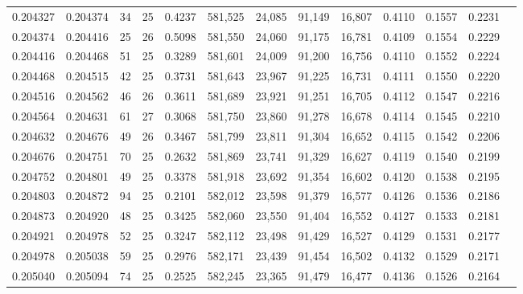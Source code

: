 \begin{tabular}{rrrrrrrrrrrrr}
0.204327 & 0.204374 &  34 &  25 &                                     0.4237 & 581,525 &  24,085 &  91,149 &  16,807 & 0.4110 & 0.1557 & 0.2231 \\
0.204374 & 0.204416 &  25 &  26 &                                     0.5098 & 581,550 &  24,060 &  91,175 &  16,781 & 0.4109 & 0.1554 & 0.2229 \\
0.204416 & 0.204468 &  51 &  25 &                                     0.3289 & 581,601 &  24,009 &  91,200 &  16,756 & 0.4110 & 0.1552 & 0.2224 \\
0.204468 & 0.204515 &  42 &  25 &                                     0.3731 & 581,643 &  23,967 &  91,225 &  16,731 & 0.4111 & 0.1550 & 0.2220 \\
0.204516 & 0.204562 &  46 &  26 &                                     0.3611 & 581,689 &  23,921 &  91,251 &  16,705 & 0.4112 & 0.1547 & 0.2216 \\
0.204564 & 0.204631 &  61 &  27 &                                     0.3068 & 581,750 &  23,860 &  91,278 &  16,678 & 0.4114 & 0.1545 & 0.2210 \\
0.204632 & 0.204676 &  49 &  26 &                                     0.3467 & 581,799 &  23,811 &  91,304 &  16,652 & 0.4115 & 0.1542 & 0.2206 \\
0.204676 & 0.204751 &  70 &  25 &                                     0.2632 & 581,869 &  23,741 &  91,329 &  16,627 & 0.4119 & 0.1540 & 0.2199 \\
0.204752 & 0.204801 &  49 &  25 &                                     0.3378 & 581,918 &  23,692 &  91,354 &  16,602 & 0.4120 & 0.1538 & 0.2195 \\
0.204803 & 0.204872 &  94 &  25 &                                     0.2101 & 582,012 &  23,598 &  91,379 &  16,577 & 0.4126 & 0.1536 & 0.2186 \\
0.204873 & 0.204920 &  48 &  25 &                                     0.3425 & 582,060 &  23,550 &  91,404 &  16,552 & 0.4127 & 0.1533 & 0.2181 \\
0.204921 & 0.204978 &  52 &  25 &                                     0.3247 & 582,112 &  23,498 &  91,429 &  16,527 & 0.4129 & 0.1531 & 0.2177 \\
0.204978 & 0.205038 &  59 &  25 &                                     0.2976 & 582,171 &  23,439 &  91,454 &  16,502 & 0.4132 & 0.1529 & 0.2171 \\
0.205040 & 0.205094 &  74 &  25 &                                     0.2525 & 582,245 &  23,365 &  91,479 &  16,477 & 0.4136 & 0.1526 & 0.2164 \\

\end{tabular}
